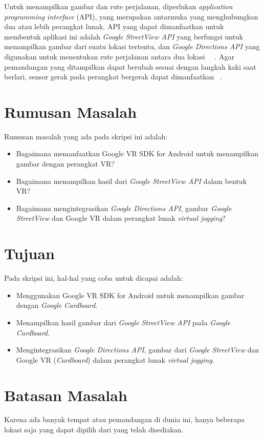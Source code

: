 Untuk menampilkan gambar dan rute perjalanan, diperlukan \textit{application programming interface} (API), yang merupakan antarmuka yang menghubungkan dua atau lebih perangkat lunak. API yang dapat dimanfaatkan untuk membentuk aplikasi  ini adalah \textit{Google StreetView API} yang berfungsi untuk menampilkan  gambar dari suatu lokasi tertentu, dan \textit{Google Directions API} yang digunakan untuk menentukan rute perjalanan antara dua lokasi ~\cite{streetview-api}~\cite{directions-api}. Agar pemandangan yang ditampilkan dapat berubah sesuai dengan langkah kaki saat berlari, sensor gerak pada perangkat bergerak dapat dimanfaatkan ~\cite{motion-sensor}. 
  
\section{Rumusan Masalah}
\label{sec:rumusan}
Rumusan masalah yang ada pada skripsi ini adalah:
\begin{itemize}
	\item Bagaimana memanfaatkan Google VR SDK for Android untuk menampilkan gambar dengan perangkat VR?
	\item Bagaimana menampilkan hasil dari \textit{Google StreetView API} dalam bentuk VR?
	\item Bagaimana mengintegrasikan \textit{Google Directions API}, gambar \textit{Google StreetView}  dan Google VR dalam perangkat lunak \textit{virtual jogging}?
\end{itemize}

\section{Tujuan}
\label{sec:tujuan}
Pada skripsi ini, hal-hal yang coba untuk dicapai adalah:
\begin{itemize}
	\item Menggunakan Google VR SDK for Android untuk menampilkan gambar dengan {\it Google Cardboard}.
	\item Menampilkan hasil gambar dari \textit{Google StreetView API} pada {\it Google Cardboard}.
	\item Mengintegrasikan \textit{Google Directions API}, gambar dari \textit{Google StreetView} dan Google VR (\textit{Cardboard}) dalam perangkat lunak {\it virtual jogging}.
\end{itemize}

\section{Batasan Masalah}
\label{sec:batasan}
Karena ada banyak tempat atau pemandangan di dunia ini, hanya beberapa lokasi saja yang dapat dipilih dari yang telah disediakan.

